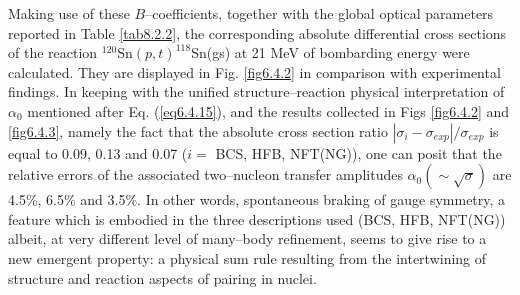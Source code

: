 Making use of these $B$--coefficients, together with the global optical parameters reported in Table \ref{tab8.2.2}, the corresponding absolute differential cross sections of the reaction $^{120}$Sn$(p,t)^{118}$Sn(gs) at 21 MeV of bombarding energy were calculated. They are displayed in Fig. \ref{fig6.4.2} in comparison with experimental findings. In keeping with the unified structure--reaction physical interpretation of $\alpha_0$ mentioned after Eq. (\ref{eq6.4.15}), and 
the results collected in Figs \ref{fig6.4.2} and \ref{fig6.4.3}, namely the fact that the absolute cross section ratio $|\sigma_i-\sigma_{exp}|/\sigma_{exp}$ is equal to 0.09, 0.13 and 0.07 ($i=$ BCS, HFB, NFT(NG)), one can posit that the relative errors of the associated two--nucleon transfer amplitudes $\alpha_0(\sim\sqrt{\sigma})$ are 4.5\%, 6.5\% and 3.5\%. In other words, spontaneous braking of gauge symmetry, a feature which is embodied in the three descriptions used (BCS, HFB, NFT(NG)) albeit, at very different level of many--body refinement, seems to give rise to a new emergent property: a physical sum rule resulting from the intertwining of structure and reaction aspects of pairing in nuclei. 

